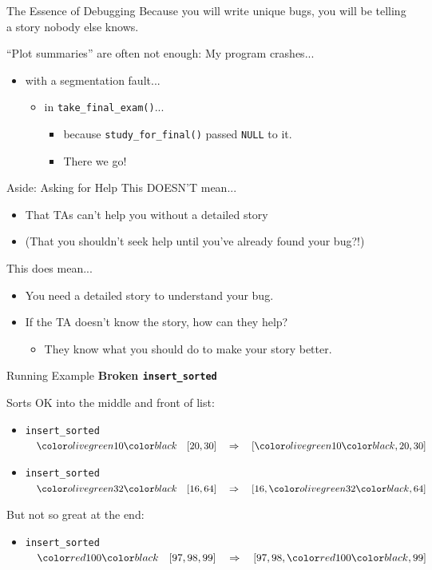 \documentclass[xcolor=dvipsnames]{beamer}
\begin{document}
\begin{frame}{The Essence of Debugging}
	Because you will write unique bugs, you will be telling a story nobody else knows.

	\linegap
	``Plot summaries'' are often not enough: My program crashes...
	\pause
	\begin{itemize}
		\item with a segmentation fault...
		\pause
		\begin{itemize}
			\item in \texttt{take\_final\_exam()}...
			\pause
			\begin{itemize}
				\item because \texttt{study\_for\_final()} passed \texttt{NULL} to it.
				\item There we go!
			\end{itemize}
		\end{itemize}
	\end{itemize}
\end{frame}

\begin{frame}{Aside: Asking for Help}
	This DOESN'T mean...
	\begin{itemize}
		\item That TAs can't help you without a detailed story
		\item (That you shouldn't seek help until you've already found your bug?!)
	\end{itemize}
	\pause
	This does mean...
	\begin{itemize}
		\item You need a detailed story to understand your bug.
		\item If the TA doesn't know the story, how can they help?
		\pause
		\begin{itemize}
			\item They know what you should do to make your story better.
		\end{itemize}
	\end{itemize}
\end{frame}

\begin{frame}{Running Example}
	\textbf{Broken \texttt{insert\_sorted}}

	\linegap
	Sorts OK into the middle and front of list:
	\begin{itemize}
		\item \texttt{insert\_sorted} $\quad \hilight{olivegreen}{10} \quad  [20,30] \quad \Rightarrow \quad [\hilight{olivegreen}{10},20,30]$
		\item \texttt{insert\_sorted} $\quad \hilight{olivegreen}{32} \quad  [16,64] \quad \Rightarrow \quad [16,\hilight{olivegreen}{32},64]$
	\end{itemize}

	\linegap
	But not so great at the end:
	\begin{itemize}
	\item \texttt{insert\_sorted} $\quad \hilight{red}{100}  \quad [97,98,99] \quad \Rightarrow \quad [97,98,\hilight{red}{100},99]$
	\end{itemize}
\end{frame}
\end{document}
